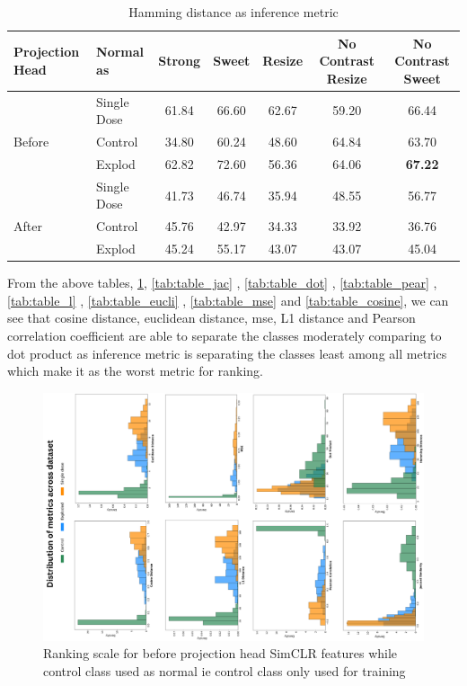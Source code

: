 \begin{table}[H]
  \centering
  \begin{tabular}{@{}llccccc@{}}
  \toprule
  Projection Head & Normal as       & Strong & Sweet & Resize & No Contrast Resize & No Contrast Sweet \\ \midrule
                  & Single Dose    & 61.84      & 66.60     & 62.67      & 59.20                  & 66.44                 \\
  Before          & Control        & 34.80      & 60.24     & 48.60      & 64.84                  & 63.70                 \\
                  & Explod         & 62.82      & 72.60     & 56.36      & 64.06                  & \textbf{67.22}                 \\ \midrule
                  & Single Dose    & 41.73      & 46.74     & 35.94      & 48.55                  & 56.77                 \\
  After           & Control        & 45.76      & 42.97     & 34.33      & 33.92                  & 36.76                 \\
                  & Explod         & 45.24      & 55.17     & 43.07      & 43.07                  & 45.04                \\ \bottomrule
  \end{tabular}
  \caption{Hamming  distance as inference metric}
  \label{tab:table_hammi}
\end{table}
From the above tables, \ref{tab:table_hammi},  \ref{tab:table_jac} ,  \ref{tab:table_dot} ,  \ref{tab:table_pear} ,  \ref{tab:table_l} ,  \ref{tab:table_eucli} ,  \ref{tab:table_mse} and \ref{tab:table_cosine}, 
we can see that cosine distance, euclidean distance, mse, L1 distance and  Pearson correlation coefficient are able to separate the classes moderately comparing to dot product as inference metric is separating the classes least among all metrics which make it as the worst metric for ranking.

\begin{figure}[H]
  \centering
  \includegraphics[scale=0.5, angle=270]{figures/predall.pdf} 
  \caption{Ranking scale for before projection head SimCLR  features while control class used as normal ie control class only used for training}
  \label{fig:bargraph}
\end{figure}


